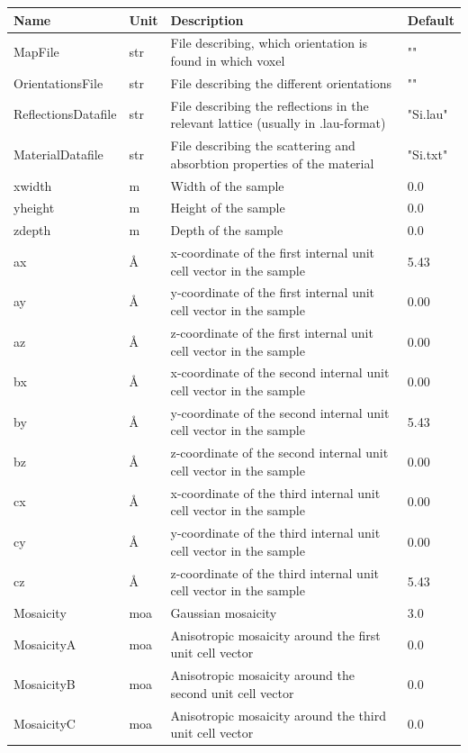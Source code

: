 \begin{longtable}{p{}p{}p{}p{}}
\toprule
\textbf{Name} & \textbf{Unit} & \textbf{Description} & \textbf{Default} \\
\midrule
\endhead
MapFile & str & File describing, which orientation is found in which voxel & "" \\
OrientationsFile & str & File describing the different orientations & "" \\
ReflectionsDatafile & str & File describing the reflections in the relevant lattice (usually in .lau-format) & "Si.lau" \\
MaterialDatafile & str & File describing the scattering and absorbtion properties of the material & "Si.txt" \\
xwidth & m & Width of the sample & 0.0 \\
yheight & m & Height of the sample & 0.0 \\
zdepth & m & Depth of the sample & 0.0 \\
ax & \AA{} & x-coordinate of the first internal unit cell vector in the sample & 5.43 \\
ay & \AA{} & y-coordinate of the first internal unit cell vector in the sample & 0.00 \\
az & \AA{} & z-coordinate of the first internal unit cell vector in the sample & 0.00 \\
bx & \AA{} & x-coordinate of the second internal unit cell vector in the sample & 0.00 \\
by & \AA{} & y-coordinate of the second internal unit cell vector in the sample & 5.43 \\
bz & \AA{} & z-coordinate of the second internal unit cell vector in the sample & 0.00 \\
cx & \AA{} & x-coordinate of the third internal unit cell vector in the sample & 0.00 \\
cy & \AA{} & y-coordinate of the third internal unit cell vector in the sample & 0.00 \\
cz & \AA{} & z-coordinate of the third internal unit cell vector in the sample & 5.43 \\
Mosaicity & moa & Gaussian mosaicity & 3.0 \\
MosaicityA & moa & Anisotropic mosaicity around the first unit cell vector & 0.0 \\
MosaicityB & moa & Anisotropic mosaicity around the second unit cell vector & 0.0 \\
MosaicityC & moa & Anisotropic mosaicity around the third unit cell vector & 0.0 \\

\end{longtable}
